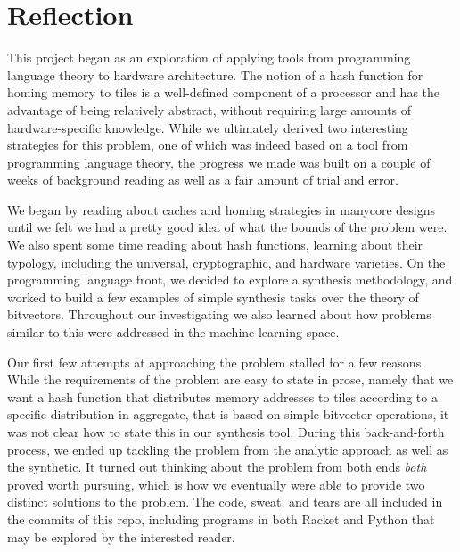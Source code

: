 
\section{Reflection}
\label{sec:Reflection}

This project began as an exploration of applying tools from programming language
theory to hardware architecture.  The notion of a hash function for homing
memory to tiles is a well-defined component of a processor and has the advantage
of being relatively abstract, without requiring large amounts of hardware-specific
knowledge.  While we ultimately derived two interesting strategies for this
problem, one of which was indeed based on a tool from programming language
theory, the progress we made was built on a couple of weeks of background
reading as well as a fair amount of trial and error.

We began by reading about caches and homing strategies in manycore designs until
we felt we had a pretty good idea of what the bounds of the problem were.  We
also spent some time reading about hash functions, learning about their
typology, including the universal, cryptographic, and hardware varieties.  On
the programming language front, we decided to explore a synthesis methodology,
and worked to build a few examples of simple synthesis tasks over the theory of
bitvectors.  Throughout our investigating we also learned about how problems
similar to this were addressed in the machine learning space.

Our first few attempts at approaching the problem stalled for a few reasons.
While the requirements of the problem are easy to state in prose, namely that we
want a hash function that distributes memory addresses to tiles according to a
specific distribution in aggregate, that is based on simple bitvector
operations, it was not clear how to state this in our synthesis tool.  During
this back-and-forth process, we ended up tackling the problem from the analytic
approach as well as the synthetic.  It turned out thinking about the problem
from both ends \textit{both} proved worth pursuing, which is how we eventually
were able to provide two distinct solutions to the problem.  The code, sweat,
and tears are all included in the commits of this repo, including programs in
both Racket and Python that may be explored by the interested reader.


